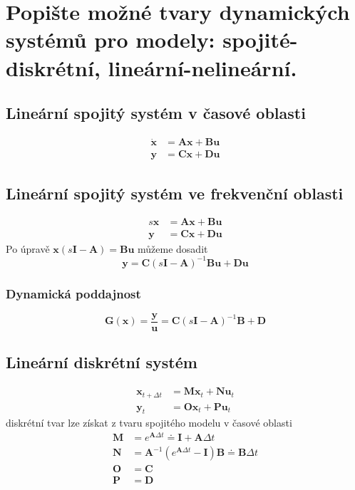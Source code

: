 \documentclass{article}
\begin{document}
	\section{Popište možné tvary dynamických systémů pro modely: spojité-diskrétní, lineární-nelineární.}

	\subsection*{Lineární spojitý systém v časové oblasti}
	\begin{align*}
		\bm{\dot{x}} &= \bm{A}\bm{x} + \bm{B}\bm{u} \\
		\bm{y} &= \bm{C}\bm{x} + \bm{D}\bm{u}
	\end{align*}
	\subsection*{Lineární spojitý systém ve frekvenční oblasti}
	\begin{align*}
		s\bm{x} &= \bm{A}\bm{x} + \bm{B}\bm{u} \\
		\bm{y} &= \bm{C}\bm{x} + \bm{D}\bm{u}
	\end{align*}
	Po úpravě $\bm{x}(s\bm{I} - \bm{A}) = \bm{B}\bm{u}$ můžeme dosadit
	\begin{equation}
		\bm{y} = \bm{C}(s\bm{I}-\bm{A})^{-1}\bm{B}\bm{u}+\bm{D}\bm{u}
	\end{equation}
	\subsubsection*{Dynamická poddajnost}
	\begin{equation}
	\bm{G}(\bm{x}) = \frac{\bm{y}}{\bm{u}} = \bm{C}(s\bm{I}-\bm{A})^{-1}\bm{B}+\bm{D}
	\end{equation}
	\subsection*{Lineární diskrétní systém}
	\begin{align*}
		\bm{x}_{t+\Delta t} &= \bm{M}\bm{x}_t + \bm{N}\bm{u}_t \\
		\bm{y}_t &= \bm{O}\bm{x}_t + \bm{P}\bm{u}_t
	\end{align*}
	diskrétní tvar lze získat z tvaru spojitého modelu v časové oblasti
	\begin{align*}
		\bm{M} &= e^{\bm{A}\Delta t} \doteq \bm{I} + \bm{A}\Delta t
		\\
		\bm{N} &= \bm{A}^{-1} \left( e^{\mathbf{A}\Delta t} - \mathbf{I} \right) \bm{B} \doteq \bm{B}\Delta t
		\\
		\bm{O} &= \bm{C}
		\\
		\bm{P} &= \bm{D}
	\end{align*}
\end{document}
